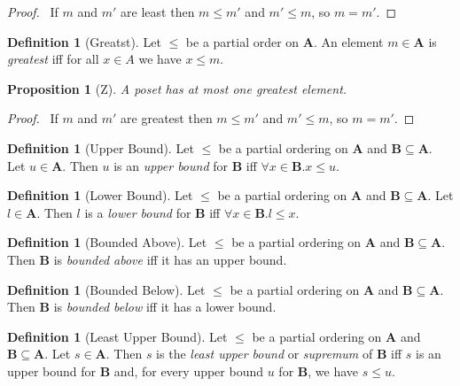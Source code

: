 \documentclass{book}
\let\qed\relax
\newtheorem{prop}[ax]{Proposition}
\theoremstyle{definition}
\newtheorem{df}[ax]{Definition}
\begin{document}
\begin{proof}
\pf\ If $m$ and $m'$ are least then $m \leq m'$ and $m' \leq m$, so $m = m'$. \qed
\end{proof}

\begin{df}[Greatst]
Let $\leq$ be a partial order on $\mathbf{A}$. An element $m \in \mathbf{A}$ is \emph{greatest} iff for all $x \in A$ we have $x \leq m$.
\end{df}

\begin{prop}[Z]
A poset has at most one greatest element.
\end{prop}

\begin{proof}
\pf\ If $m$ and $m'$ are greatest then $m \leq m'$ and $m' \leq m$, so $m = m'$. \qed
\end{proof}

\begin{df}[Upper Bound]
Let $\leq$ be a partial ordering on $\mathbf{A}$ and $\mathbf{B} \subseteq \mathbf{A}$. Let $u \in \mathbf{A}$. Then $u$ is an \emph{upper bound} for $\mathbf{B}$ iff $\forall x \in \mathbf{B}. x \leq u$.
\end{df}

\begin{df}[Lower Bound]
Let $\leq$ be a partial ordering on $\mathbf{A}$ and $\mathbf{B} \subseteq \mathbf{A}$. Let $l \in \mathbf{A}$. Then $l$ is a \emph{lower bound} for $\mathbf{B}$ iff $\forall x \in \mathbf{B}. l \leq x$.
\end{df}

\begin{df}[Bounded Above]
Let $\leq$ be a partial ordering on $\mathbf{A}$ and $\mathbf{B} \subseteq \mathbf{A}$. Then $\mathbf{B}$ is \emph{bounded above} iff it has an upper bound.
\end{df}

\begin{df}[Bounded Below]
Let $\leq$ be a partial ordering on $\mathbf{A}$ and $\mathbf{B} \subseteq \mathbf{A}$. Then $\mathbf{B}$ is \emph{bounded below} iff it has a lower bound.
\end{df}

\begin{df}[Least Upper Bound]
Let $\leq$ be a partial ordering on $\mathbf{A}$ and $\mathbf{B} \subseteq \mathbf{A}$. Let $s \in \mathbf{A}$. Then $s$ is the \emph{least upper bound} or \emph{supremum} of $\mathbf{B}$ iff $s$ is an upper bound for $\mathbf{B}$ and, for every upper bound $u$ for $\mathbf{B}$, we have $s \leq u$.
\end{df}
\end{document}
